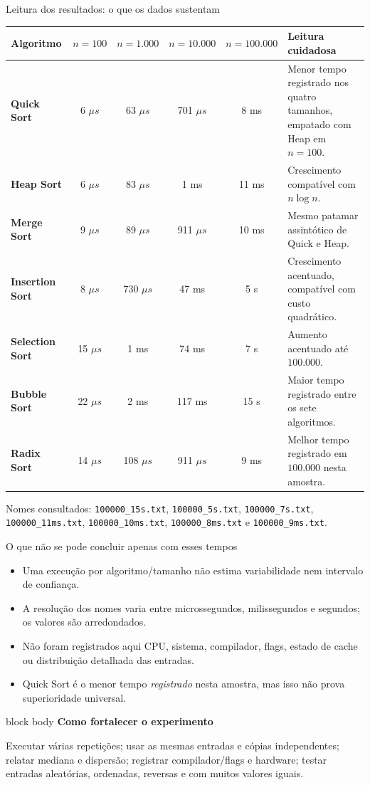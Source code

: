 \documentclass[aspectratio=169,11pt]{beamer}
\newcommand{\softbox}[2]{%
  \begin{beamercolorbox}[wd=\linewidth,sep=.8em,rounded=false]{block body}
    {\bfseries #1}\par\vspace{.25em}#2
  \end{beamercolorbox}
}
\begin{document}
\begin{frame}{Leitura dos resultados: o que os dados sustentam}
  \scriptsize
  \begin{tabularx}{\textwidth}{>{\bfseries}p{2.05cm} c c c c X}
    \toprule
    Algoritmo & \(n=100\) & \(n=1.000\) & \(n=10.000\) & \(n=100.000\) & Leitura cuidadosa \\
    \midrule
    Quick Sort & 6 \(\mu s\) & 63 \(\mu s\) & 701 \(\mu s\) & 8 ms & Menor tempo registrado nos quatro tamanhos, empatado com Heap em \(n=100\). \\
    Heap Sort & 6 \(\mu s\) & 83 \(\mu s\) & 1 ms & 11 ms & Crescimento compatível com \(n\log n\). \\
    Merge Sort & 9 \(\mu s\) & 89 \(\mu s\) & 911 \(\mu s\) & 10 ms & Mesmo patamar assintótico de Quick e Heap. \\
    Insertion Sort & 8 \(\mu s\) & 730 \(\mu s\) & 47 ms & 5 s & Crescimento acentuado, compatível com custo quadrático. \\
    Selection Sort & 15 \(\mu s\) & 1 ms & 74 ms & 7 s & Aumento acentuado até \(100.000\). \\
    Bubble Sort & 22 \(\mu s\) & 2 ms & 117 ms & 15 s & Maior tempo registrado entre os sete algoritmos. \\
    Radix Sort & 14 \(\mu s\) & 108 \(\mu s\) & 911 \(\mu s\) & 9 ms & Melhor tempo registrado em \(100.000\) nesta amostra. \\
    \bottomrule
  \end{tabularx}
  \vspace{.1em}
  \tiny Nomes consultados: \texttt{100000\_15s.txt}, \texttt{100000\_5s.txt}, \texttt{100000\_7s.txt}, \texttt{100000\_11ms.txt}, \texttt{100000\_10ms.txt}, \texttt{100000\_8ms.txt} e \texttt{100000\_9ms.txt}.
\end{frame}

\begin{frame}{O que não se pode concluir apenas com esses tempos}
  \begin{itemize}
    \item Uma execução por algoritmo/tamanho não estima variabilidade nem intervalo de confiança.
    \item A resolução dos nomes varia entre microssegundos, milissegundos e segundos; os valores são arredondados.
    \item Não foram registrados aqui CPU, sistema, compilador, flags, estado de cache ou distribuição detalhada das entradas.
    \item Quick Sort é o menor tempo \textit{registrado} nesta amostra, mas isso não prova superioridade universal.
  \end{itemize}
  \vspace{.4em}
  \softbox{Como fortalecer o experimento}{Executar várias repetições; usar as mesmas entradas e cópias independentes; relatar mediana e dispersão; registrar compilador/flags e hardware; testar entradas aleatórias, ordenadas, reversas e com muitos valores iguais.}
\end{frame}
\end{document}

